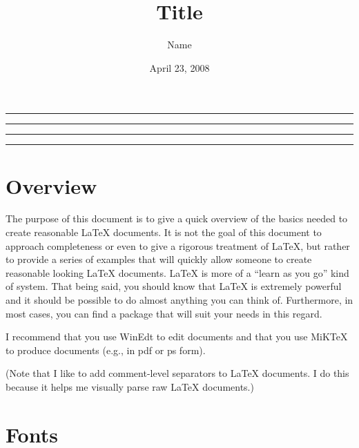 \documentclass{article}
\title{Title}
\author{Name}
\date{April 23, 2008}
\begin{document}

\maketitle %

\noindent \rule{7.0in}{.02in} %
\noindent \rule[.2in]{7.0in}{.03in} %

\tableofcontents %

\bigskip

\noindent \rule{7.0in}{.03in} %
\noindent \rule[.2in]{7.0in}{.02in} %

\newpage


\section{Overview}\label{overview}

The purpose of this document is to give a quick overview of the
basics needed to create reasonable LaTeX documents. It is not the
goal of this document to approach completeness or even to give a
rigorous treatment of LaTeX, but rather to provide a series of
examples that will quickly allow someone to create reasonable
looking LaTeX documents. LaTeX is more of a ``learn as you go''
kind of system. That being said, you should know that LaTeX is
extremely powerful and it should be possible to do almost anything
you can think of. Furthermore, in most cases, you can find a
package that will suit your needs in this regard.


I recommend that you use WinEdt to edit documents and that you use
MiKTeX to produce documents (e.g., in pdf or ps form).

(Note that I like to add comment-level separators to LaTeX
documents. I do this because it helps me visually parse raw LaTeX
documents.)

\section{Fonts}
\end{document}
